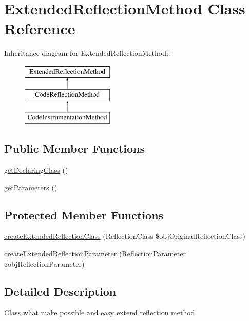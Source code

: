 \hypertarget{class_extended_reflection_method}{
\section{ExtendedReflectionMethod Class Reference}
\label{class_extended_reflection_method}
}
Inheritance diagram for ExtendedReflectionMethod::\begin{figure}[H]
\begin{center}
\leavevmode
\includegraphics[height=3cm]{class_extended_reflection_method}
\end{center}
\end{figure}
\subsection*{Public Member Functions}
\begin{CompactItemize}
\item 
\hyperlink{class_extended_reflection_method_acff3f8d93cc250281f0f73bff3422e1}{getDeclaringClass} ()
\item 
\hyperlink{class_extended_reflection_method_015cb52e5774a1972d296c9694d2a3c3}{getParameters} ()
\end{CompactItemize}
\subsection*{Protected Member Functions}
\begin{CompactItemize}
\item 
\hyperlink{class_extended_reflection_method_6b56ec198bc6a5b5a72076e4e7c19e29}{createExtendedReflectionClass} (ReflectionClass \$objOriginalReflectionClass)
\item 
\hyperlink{class_extended_reflection_method_98ceb248f2b535a3a83ac2e7990e0c1f}{createExtendedReflectionParameter} (ReflectionParameter \$objReflectionParameter)
\end{CompactItemize}


\subsection{Detailed Description}
Class what make possible and easy extend reflection method

